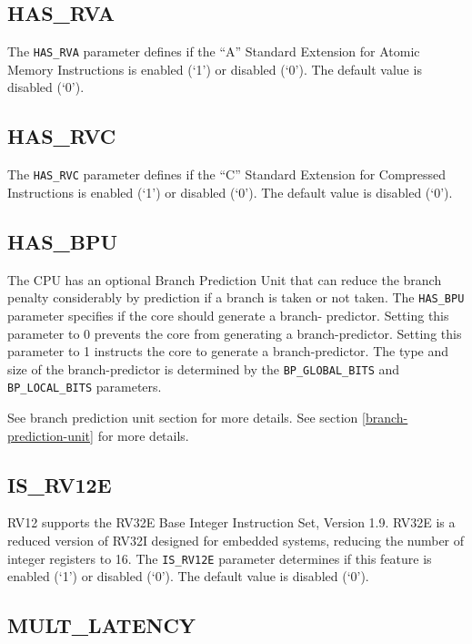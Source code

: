 \subsection{HAS\_RVA}\label{HAS_RVA}

The \texttt{HAS\_RVA} parameter defines if the ``A'' Standard Extension for
Atomic Memory Instructions is enabled (`1') or disabled (`0'). The
default value is disabled (`0').

\subsection{HAS\_RVC}\label{has_rvc}

The \texttt{HAS\_RVC} parameter defines if the ``C'' Standard Extension for
Compressed Instructions is enabled (`1') or disabled (`0'). The default
value is disabled (`0').

\subsection{HAS\_BPU}\label{has_bpu}

The CPU has an optional Branch Prediction Unit that can reduce the branch
penalty considerably by prediction if a branch is taken or not taken. The
\texttt{HAS\_BPU} parameter specifies if the core should generate a branch-
predictor. Setting this parameter to 0 prevents the core from generating a
branch-predictor. Setting this parameter to 1 instructs the core to generate a
branch-predictor. The type and size of the branch-predictor is determined by the
\texttt{BP\_GLOBAL\_BITS} and \texttt{BP\_LOCAL\_BITS} parameters.

\ifdefined\MARKDOWN
See branch prediction unit section for more details.
\else
See section \ref{branch-prediction-unit}  for more details.
\fi

\subsection{IS\_RV12E}\label{is_rv12e}

RV12 supports the RV32E Base Integer Instruction Set, Version 1.9. RV32E is a
reduced version of RV32I designed for embedded systems, reducing the number of
integer registers to 16. The \texttt{IS\_RV12E} parameter determines if this
feature is enabled (`1') or disabled (`0'). The default value is disabled (`0').

\subsection{MULT\_LATENCY}\label{mult_latency}

